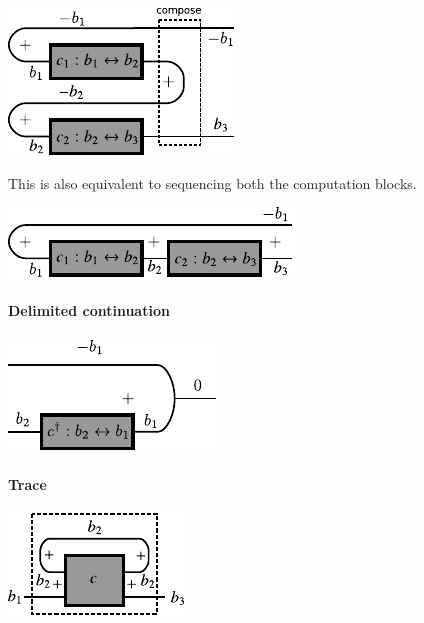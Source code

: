\documentclass[preprint]{sigplanconf}
\begin{document}
{\begin{center}
  \includegraphics{diagrams/compose.pdf}
\end{center}

This is also equivalent to sequencing both the computation blocks. 

\begin{center}
  \includegraphics{diagrams/compose2.pdf}
\end{center}


\paragraph*{Delimited continuation}

\begin{center}
  \includegraphics{diagrams/delimc.pdf}
\end{center}

\paragraph*{Trace }


\begin{center}
  \includegraphics{diagrams/trace.pdf}
\end{center}

}
\end{document}
